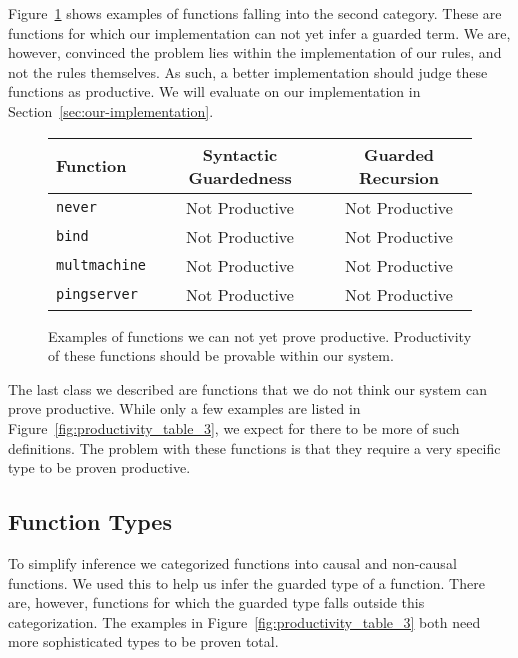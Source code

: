 Figure~\ref{fig:productivity_table_2} shows examples of functions falling into
the second category. These are functions for which our implementation can not
yet infer a guarded term. We are, however, convinced the problem lies within the
implementation of our rules, and not the rules themselves. As such, a better
implementation should judge these functions as productive. We will evaluate on
our implementation in Section~\ref{sec:our-implementation}.

\begin{figure}[h]
\begin{center}
  \begin{tabular}{| l | c | c |} \hline
    Function & Syntactic Guardedness & Guarded Recursion \\ \hline
    \texttt{never} & Not Productive & Not Productive \\ \hline
    \texttt{bind} & Not Productive & Not Productive \\ \hline
    \texttt{multmachine} & Not Productive & Not Productive \\ \hline
    \texttt{pingserver} & Not Productive & Not Productive \\ \hline
  \end{tabular}
\end{center}
  \caption{Examples of functions we can not yet prove productive. Productivity
    of these
    functions should be provable within our system.}
  \label{fig:productivity_table_2}
\end{figure}

The last class we described are functions that we do not think our system can
prove productive. While only a few examples are listed in
Figure~\ref{fig:productivity_table_3}, we expect for there to be more of such
definitions. The problem with these functions is that they require a very specific
type to be proven productive.

\subsection{Function Types}
To simplify inference we categorized functions into causal and
non-causal functions. We used this to help us infer the guarded type of a function. There
are, however, functions for which the guarded type falls outside this
categorization. The examples in Figure~\ref{fig:productivity_table_3} both need
more sophisticated types to be proven total.

